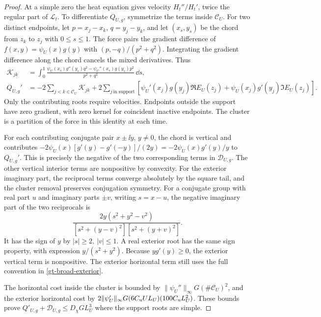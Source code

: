 \begin{proof}
At a simple zero the heat equation gives velocity \(H_t''/H_t'\),
twice the regular part of \(\mathcal L_t\). To differentiate
\(Q_{U,g}\), symmetrize the terms inside \(\mathcal C_U\).
For two distinct endpoints, let \(p=x_j-x_k\), \(q=y_j-y_k\),
and let \((x_s,y_s)\) be the chord from \(z_k\) to \(z_j\) with
\(0\le s\le1\). The force pairs the gradient difference of
\(f(x,y)=\psi_U(x)g(y)\) with \((p,-q)/(p^2+q^2)\). Integrating the
gradient difference along the chord cancels the mixed derivatives.
Thus
\[
 \begin{split}
 \mathcal K_{jk}
 &=\int_0^1
   \frac{\psi_U(x_s)g''(y_s)q^2-\psi_U''(x_s)g(y_s)p^2}
        {p^2+q^2}\,\dd s,\\
 Q_{U,g}'
 &=-2\sum_{j<k\in\mathcal C_U}\mathcal K_{jk}
   +2\sum_{j\,\text{in support}}
       [\psi_U'(x_j)g(y_j)\Re E_U(z_j)
        +\psi_U(x_j)g'(y_j)\Im E_U(z_j)] .
 \end{split}
\]
Only the contributing roots require velocities. Endpoints outside
the support have zero gradient, with zero kernel for coincident
inactive endpoints. The cluster is a partition of the force in this
identity at each time.

For each contributing conjugate pair \(x\pm\ii y\), \(y\ne0\), the chord
is vertical and contributes
\(-2\psi_U(x)[g'(y)-g'(-y)]/(2y)=-2\psi_U(x)g'(y)/y\)
to \(Q_{U,g}'\). This is precisely the negative of the two corresponding
terms in \(\mathcal D_{U,g}\). The other vertical interior terms
are nonpositive by convexity. For the exterior imaginary part,
the reciprocal terms converge absolutely by the square tail, and
the cluster removal preserves conjugation symmetry. For a conjugate
group with real part \(u\) and imaginary parts \(\pm v\), writing
\(s=x-u\), the negative imaginary part of the two reciprocals is
\[
 \frac{2y(s^2+y^2-v^2)}
      {[s^2+(y-v)^2][s^2+(y+v)^2]} .
\]
It has the sign of \(y\) by \(|s|\ge2,\ |v|\le1\). A real exterior
root has the same sign property, with expression \(y/(s^2+y^2)\).
Because \(yg'(y)\ge0\), the exterior vertical term is nonpositive.
The exterior horizontal term still uses the full convention in
\eqref{gt-broad-exterior}.

The horizontal cost inside the cluster is bounded by
\(\|\psi_U''\|_\infty G(\#\mathcal C_U)^2\), and the exterior
horizontal cost by
\(2\|\psi_U'\|_\infty G(6C_{\rm u}UL_U)(100C_{\rm u}L_U^2)\).
These bounds prove \(Q'_{U,g}+\mathcal D_{U,g}\le D_\chi GL_U^3\)
where the support roots are simple.


\end{proof}
